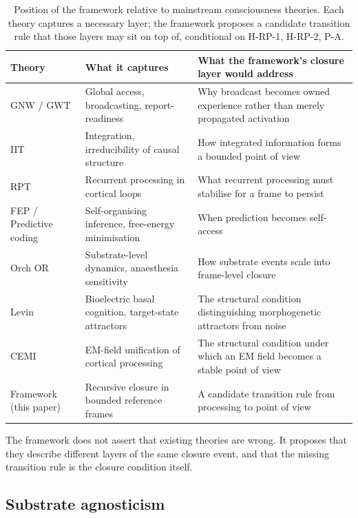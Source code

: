 \documentclass[11pt]{article}
\theoremstyle{plain}
\theoremstyle{definition}
\theoremstyle{remark}
\begin{document}
\begin{table}[h]
\centering
\small
\caption{Position of the framework relative to mainstream consciousness theories. Each theory captures a necessary layer; the framework proposes a candidate transition rule that those layers may sit on top of, conditional on H-RP-1, H-RP-2, P-A.}\label{tab:theory-comparison}
\begin{tabular}{p{2.5cm}p{4cm}p{4cm}}
\toprule
Theory & What it captures & What the framework's closure layer would address \\
\midrule
GNW / GWT~\citep{ConsciousnessAdversarial} & Global access, broadcasting, report-readiness & Why broadcast becomes owned experience rather than merely propagated activation \\
IIT & Integration, irreducibility of causal structure & How integrated information forms a bounded point of view \\
RPT & Recurrent processing in cortical loops & What recurrent processing must stabilise for a frame to persist \\
FEP / Predictive coding~\citep{FristonFreeEnergy} & Self-organising inference, free-energy minimisation & When prediction becomes self-access \\
Orch OR~\citep{OrchOR2025} & Substrate-level dynamics, anaesthesia sensitivity & How substrate events scale into frame-level closure \\
Levin~\citep{LevinBasalCognition} & Bioelectric basal cognition, target-state attractors & The structural condition distinguishing morphogenetic attractors from noise \\
CEMI~\citep{McFaddenCEMI} & EM-field unification of cortical processing & The structural condition under which an EM field becomes a stable point of view \\
\midrule
Framework (this paper) & Recursive closure in bounded reference frames & A candidate transition rule from processing to point of view \\
\bottomrule
\end{tabular}
\end{table}

The framework does not assert that existing theories are wrong. It proposes that they describe different layers of the same closure event, and that the missing transition rule is the closure condition itself.

\subsection{Substrate agnosticism}
\end{document}
